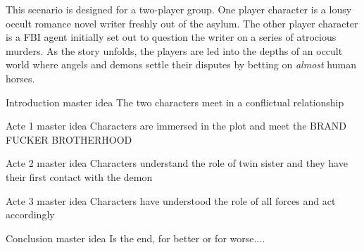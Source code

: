 \begin{synopsis}

This scenario is designed for a two-player group. One player character is a
lousy occult romance novel writer freshly out of the asylum. The other player
character is a FBI agent initially set out to question the writer on a series
of atrocious murders. As the story unfolds, the players are led into the
depths of an occult world where angels and demons settle their disputes by
betting on \textit{almost} human horses.

\hrulefill

Introduction master idea
The two characters meet in a conflictual relationship

Acte 1 master idea
Characters are immersed in the plot and meet the BRAND FUCKER BROTHERHOOD

Acte 2 master idea
Characters understand the role of twin sister and they have their first contact with the demon

Acte 3 master idea
Characters have understood the role of all forces and act accordingly

Conclusion master idea
Is the end, for better or for worse....

\end{synopsis}
